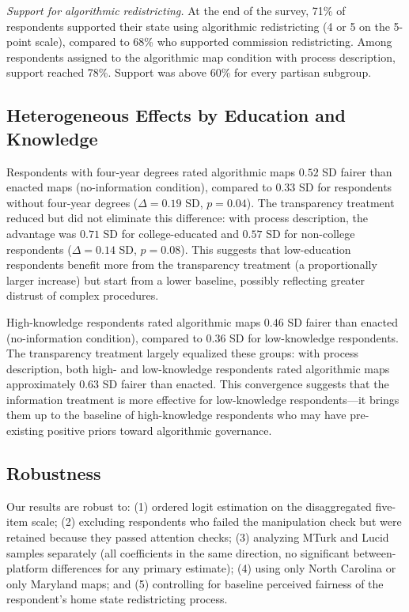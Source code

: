 \textit{Support for algorithmic redistricting.} At the end of the survey, 71\% of respondents supported their state using algorithmic redistricting (4 or 5 on the 5-point scale), compared to 68\% who supported commission redistricting. Among respondents assigned to the algorithmic map condition with process description, support reached 78\%. Support was above 60\% for every partisan subgroup.

\subsection{Heterogeneous Effects by Education and Knowledge}

Respondents with four-year degrees rated algorithmic maps $0.52$ SD fairer than enacted maps (no-information condition), compared to $0.33$ SD for respondents without four-year degrees ($\Delta = 0.19$ SD, $p = 0.04$). The transparency treatment reduced but did not eliminate this difference: with process description, the advantage was $0.71$ SD for college-educated and $0.57$ SD for non-college respondents ($\Delta = 0.14$ SD, $p = 0.08$). This suggests that low-education respondents benefit more from the transparency treatment (a proportionally larger increase) but start from a lower baseline, possibly reflecting greater distrust of complex procedures.

High-knowledge respondents rated algorithmic maps $0.46$ SD fairer than enacted (no-information condition), compared to $0.36$ SD for low-knowledge respondents. The transparency treatment largely equalized these groups: with process description, both high- and low-knowledge respondents rated algorithmic maps approximately $0.63$ SD fairer than enacted. This convergence suggests that the information treatment is more effective for low-knowledge respondents---it brings them up to the baseline of high-knowledge respondents who may have pre-existing positive priors toward algorithmic governance.

\subsection{Robustness}

Our results are robust to: (1) ordered logit estimation on the disaggregated five-item scale; (2) excluding respondents who failed the manipulation check but were retained because they passed attention checks; (3) analyzing MTurk and Lucid samples separately (all coefficients in the same direction, no significant between-platform differences for any primary estimate); (4) using only North Carolina or only Maryland maps; and (5) controlling for baseline perceived fairness of the respondent's home state redistricting process.

